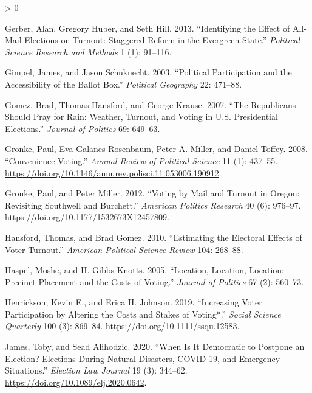 \documentclass[
  12pt,
]{article}
\newlength{\cslhangindent}
\newenvironment{CSLReferences}[2] %
 {%
  \setlength{\parindent}{0pt}
  \ifodd #1 \everypar{\setlength{\hangindent}{\cslhangindent}}\ignorespaces\fi
  \ifnum #2 > 0
  \setlength{\parskip}{#2\baselineskip}
  \fi
 }%
 {}
\begin{document}
\begin{CSLReferences}{1}{0}
\leavevmode\hypertarget{ref-Gerber2013}{}%
Gerber, Alan, Gregory Huber, and Seth Hill. 2013. {``Identifying the {Effect} of {All}-{Mail Elections} on {Turnout}: {Staggered Reform} in the {Evergreen State}.''} \emph{Political Science Research and Methods} 1 (1): 91--116.

\leavevmode\hypertarget{ref-Gimpel2003}{}%
Gimpel, James, and Jason Schuknecht. 2003. {``Political {Participation} and the {Accessibility} of the {Ballot Box}.''} \emph{Political Geography} 22: 471--88.

\leavevmode\hypertarget{ref-Gomez2007}{}%
Gomez, Brad, Thomas Hansford, and George Krause. 2007. {``The {Republicans Should Pray} for {Rain}: {Weather}, {Turnout}, and {Voting} in {U}.{S}. {Presidential Elections}.''} \emph{Journal of Politics} 69: 649--63.

\leavevmode\hypertarget{ref-Gronke2008}{}%
Gronke, Paul, Eva Galanes-Rosenbaum, Peter A. Miller, and Daniel Toffey. 2008. {``Convenience {Voting}.''} \emph{Annual Review of Political Science} 11 (1): 437--55. \url{https://doi.org/10.1146/annurev.polisci.11.053006.190912}.

\leavevmode\hypertarget{ref-Gronke2012}{}%
Gronke, Paul, and Peter Miller. 2012. {``Voting by {Mail} and {Turnout} in {Oregon}: {Revisiting Southwell} and {Burchett}.''} \emph{American Politics Research} 40 (6): 976--97. \url{https://doi.org/10.1177/1532673X12457809}.

\leavevmode\hypertarget{ref-Hansford2010}{}%
Hansford, Thomas, and Brad Gomez. 2010. {``Estimating the {Electoral Effects} of {Voter Turnout}.''} \emph{American Political Science Review} 104: 268--88.

\leavevmode\hypertarget{ref-Haspel2005}{}%
Haspel, Moshe, and H. Gibbs Knotts. 2005. {``Location, {Location}, {Location}: {Precinct Placement} and the {Costs} of {Voting}.''} \emph{Journal of Politics} 67 (2): 560--73.

\leavevmode\hypertarget{ref-Henrickson2019}{}%
Henrickson, Kevin E., and Erica H. Johnson. 2019. {``Increasing {Voter Participation} by {Altering} the {Costs} and {Stakes} of {Voting}*.''} \emph{Social Science Quarterly} 100 (3): 869--84. \url{https://doi.org/10.1111/ssqu.12583}.

\leavevmode\hypertarget{ref-James2020}{}%
James, Toby, and Sead Alihodzic. 2020. {``When {Is It Democratic} to {Postpone} an {Election}? {Elections During Natural Disasters}, {COVID}-19, and {Emergency Situations}.''} \emph{Election Law Journal} 19 (3): 344--62. \url{https://doi.org/10.1089/elj.2020.0642}.


\end{CSLReferences}
\end{document}
